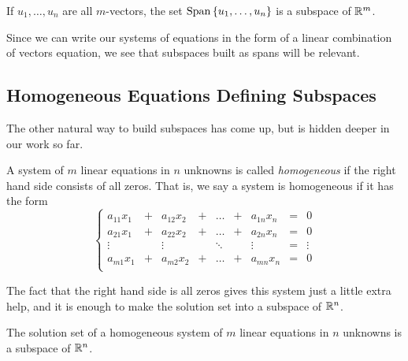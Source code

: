 \documentclass[00-livre-main.tex]{subfiles}
\begin{document}
\begin{theorem}If $u_1, \ldots, u_n$ are all $m$-vectors, the set $\mathrm{Span}\left\{ u_1,\ldots,u_n \right\}$ is a subspace of $\mathbb{R}^m$.
\end{theorem}

Since we can write our systems of equations in the form of a linear combination of vectors equation, we see that subspaces built as spans will be relevant.


\subsection*{Homogeneous Equations Defining Subspaces}

The other natural way to build subspaces has come up, but is hidden deeper in our work so far. 

\begin{definition}
A system of $m$ linear equations in $n$ unknowns is called \emph{homogeneous} if the right hand side consists of all zeros. That is, we say a system is homogeneous if it has the form
\[
\left\{\begin{array}{rrrrrrrrr}
a_{11}x_1 & + & a_{12} x_2 & + & \dots & + & a_{1n}x_n & = & 0 \\
a_{21}x_1 & + & a_{22} x_2 & + & \dots & + & a_{2n}x_n & = & 0 \\
\vdots &  & \vdots &  & \ddots & & \vdots & = & \vdots \\
a_{m1}x_1 & + & a_{m2} x_2 & + & \dots & + & a_{mn}x_n & = & 0 \\
\end{array}\right. 
\]
\end{definition}

The fact that the right hand side is all zeros gives this system just a little extra help, and it is enough to make the solution set into a subspace of $\mathbb{R}^n$.

\begin{theorem}\label{thm:homogeneous-eqns-subspace}
The solution set of a homogeneous system of $m$ linear equations in $n$ unknowns is a subspace of $\mathbb{R}^n$.
\end{theorem}
\end{document}
